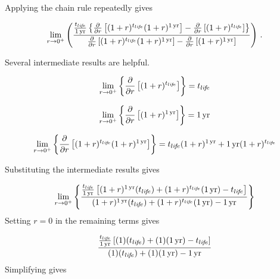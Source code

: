 Applying the chain rule repeatedly gives

\begin{equation}
  \lim_{r \to 0^+} \left(
  \frac{\frac{\tlife}{\oneyr} 
      \left\{ \frac{\partial}{\partial r} \left[  (1 + r)^{\tlife} (1 + r)^{\oneyr} \right]  - 
              \frac{\partial}{\partial r} \left[  (1 + r)^{\tlife} \right] 
      \right\}}
  {\frac{\partial}{\partial r} \left[    (1 + r)^{\tlife} (1 + r)^{\oneyr} \right]  - 
              \frac{\partial}{\partial r} \left[  (1 + r)^{\oneyr} \right] }
  \right) \, .
\end{equation}

Several intermediate results are helpful.

\begin{equation}
  \lim_{r \to 0^+} \left\{\frac{\partial}{\partial r} \left[ (1 + r)^{t_{li\!f\!e}} \right] \right\} = t_{li\!f\!e}
\end{equation}

\begin{equation}
  \lim_{r \to 0^+} \left\{\frac{\partial}{\partial r} \left[ (1 + r)^{1\,\mathrm{yr}} \right] \right\} = 1\,\mathrm{yr}
\end{equation}

\begin{equation}
  \lim_{r \to 0^+} \left\{\frac{\partial}{\partial r} \left[ (1 + r)^{t_{li\!f\!e}} (1 + r)^{1\,\mathrm{yr}} \right] \right\} = t_{li\!f\!e} (1 + r)^{1\,\mathrm{yr}}  + 1\,\mathrm{yr} (1 + r)^{t_{li\!f\!e}} 
\end{equation}

Substituting the intermediate results gives

\begin{equation}
  \lim_{r \to 0^+} \left\{
                         \frac{\frac{\tlife}{\oneyr}
                         \left[ (1 + r)^{\oneyr} (\tlife) + 
                         (1 + r)^{\tlife} (\oneyr) - 
                         \tlife \right]}
                        {(1 + r)^{\oneyr} (\tlife) + 
                         (1 + r)^{\tlife} (\oneyr) - 
                         \oneyr}
                    \right\}
\end{equation}
%
Setting $r = 0$ in the remaining terms gives

\begin{equation}
  \frac{\frac{\tlife}{\oneyr}
              \left[ (1) (\tlife) + 
                     (1) (\oneyr) - 
                     \tlife
              \right]}
       {(1) (\tlife) + 
        (1) (\oneyr) - 
        \oneyr}
\end{equation}
%
Simplifying gives

